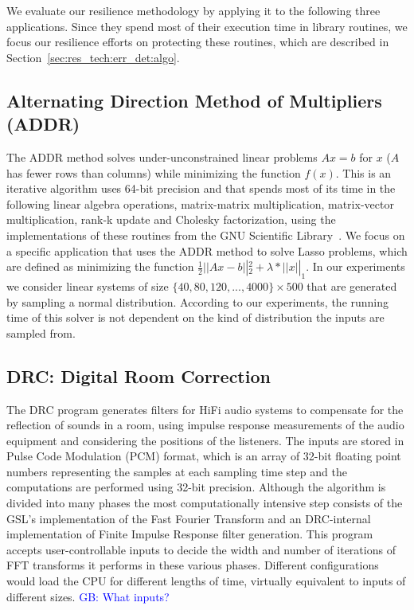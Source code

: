 \documentclass{sig-alternate}
\newcommand{\greg}[1]{%
  \textcolor{blue}{GB: #1}
}
\begin{document}
We evaluate our resilience methodology by applying it to the following three applications.
Since they spend most of their execution time in library routines, we focus our resilience efforts on protecting these routines, which are described in Section~\ref{sec:res_tech:err_det:algo}.


\subsection{Alternating Direction Method of Multipliers (ADDR)}
\label{sec:apps:lasso}
The ADDR method solves under-unconstrained linear problems $Ax=b$ for $x$ ($A$ has fewer rows than columns) while minimizing the function $f(x)$.
This is an iterative algorithm uses 64-bit precision and that spends most of its time in the following linear algebra operations, matrix-matrix multiplication, matrix-vector multiplication, rank-k update and Cholesky factorization, using the implementations of these routines from the GNU Scientific Library~\cite{gsl:2011}.
We focus on a specific application that uses the ADDR method to solve Lasso problems, which are defined as minimizing the function $\frac{1}{2} \left|| Ax - b \right||_2^2 + \lambda*\left|| x \right||_1$.
In our experiments we consider linear systems of size $\{40, 80, 120, ..., 4000\} \times 500$ that are generated by sampling a normal distribution.
According to our experiments, the running time of this solver is not dependent on the kind of distribution the inputs are sampled from.

\subsection{DRC: Digital Room Correction}
\label{sec:apps:drc}

The DRC program generates filters for HiFi audio systems to compensate for the reflection of sounds in a room, using impulse response measurements of the audio equipment and considering the positions of the listeners.
The inputs are stored in Pulse Code Modulation (PCM) format, which is an array of 32-bit floating point numbers representing the samples at each sampling time step and the computations are performed using 32-bit precision.
Although the algorithm is divided into many phases the most computationally intensive step consists of the GSL's implementation of the Fast Fourier Transform and an DRC-internal implementation of Finite Impulse Response filter generation.
This program accepts user-controllable inputs to decide the width and number of iterations of FFT transforms it performs in these various phases.
Different configurations would load the CPU for different lengths of time, virtually equivalent to inputs of different sizes.
\greg{What inputs?}
\end{document}
